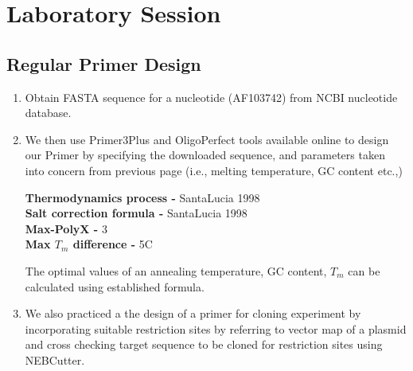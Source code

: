 \documentclass[12pt,a4paper]{report}
\begin{document}
\clearpage
\section*{Laboratory Session}

\subsection*{Regular Primer Design}
\begin{enumerate}
    \item Obtain FASTA sequence for a nucleotide (AF103742) from NCBI 
    nucleotide database.
    \item We then use \textup{Primer3Plus} and OligoPerfect tools available 
    online to design our Primer by specifying the downloaded sequence, and 
    parameters taken into concern from previous page (i.e., melting temperature,
    GC content etc.,)
    
    \textbf{Thermodynamics process -} SantaLucia 1998\\
    \textbf{Salt correction formula -} SantaLucia 1998\\
    \textbf{Max-PolyX -} 3\\
    \textbf{Max $T_m$ difference -} 5\degree C
    
    The optimal values of an annealing temperature, GC content, $T_m$ can be 
    calculated using established formula.
    \item We also practiced a the design of a primer for cloning experiment by 
    incorporating suitable restriction sites by referring to vector map of a 
    plasmid and cross checking target sequence to be cloned for restriction 
    sites using \textup{NEBCutter}.
\end{enumerate}
\end{document}
